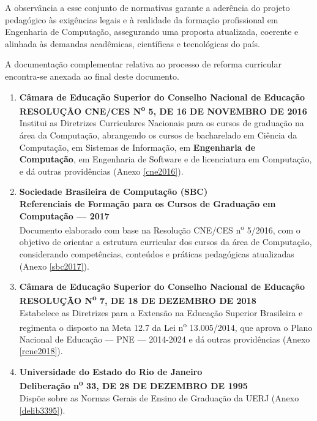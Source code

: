 A observância a esse conjunto de normativas garante a aderência do projeto pedagógico às exigências legais e à realidade da formação profissional em Engenharia de Computação, assegurando uma proposta atualizada, coerente e alinhada às demandas acadêmicas, científicas e tecnológicas do país.

A documentação complementar relativa ao processo de reforma curricular encontra-se anexada ao final deste documento.

\begin{enumerate}
      \item \textbf{Câmara de Educação Superior do Conselho Nacional de Educação}  \\
            \textbf{RESOLUÇÃO CNE/CES N\textsuperscript{o} 5, DE 16 DE NOVEMBRO DE 2016}  \\
            Institui as Diretrizes Curriculares Nacionais para os cursos de graduação na área da Computação, abrangendo os cursos de bacharelado em Ciência da Computação, em Sistemas de Informação, em \textbf{Engenharia de Computação}, em Engenharia de Software e de licenciatura em Computação, e dá outras providências (Anexo \ref{cne2016}).

      \item \textbf{Sociedade Brasileira de Computação (SBC)}  \\
            \textbf{Referenciais de Formação para os Cursos de Graduação em Computação –-- 2017} \\
            Documento elaborado com base na Resolução CNE/CES n\textsuperscript{o} 5/2016, com o objetivo de orientar a estrutura curricular dos cursos da área de Computação, considerando competências, conteúdos e práticas pedagógicas atualizadas (Anexo \ref{sbc2017}).

      \item \textbf{Câmara de Educação Superior do Conselho Nacional de Educação}  \\
            \textbf{RESOLUÇÃO N\textsuperscript{o} 7, DE 18 DE DEZEMBRO DE 2018}  \\
            Estabelece as Diretrizes para a Extensão na Educação Superior Brasileira e regimenta o disposto na Meta 12.7 da Lei n\textsuperscript{o} 13.005/2014, que aprova o Plano Nacional de Educação –-- PNE –-- 2014-2024 e dá outras providências (Anexo \ref{rcne2018}).

      \item \textbf{Universidade do Estado do Rio de Janeiro}  \\
            \textbf{Deliberação n\textsuperscript{o} 33, DE 28 DE DEZEMBRO DE 1995}  \\
            Dispõe sobre as Normas Gerais de Ensino de Graduação da UERJ (Anexo \ref{delib3395}).


\end{enumerate}
